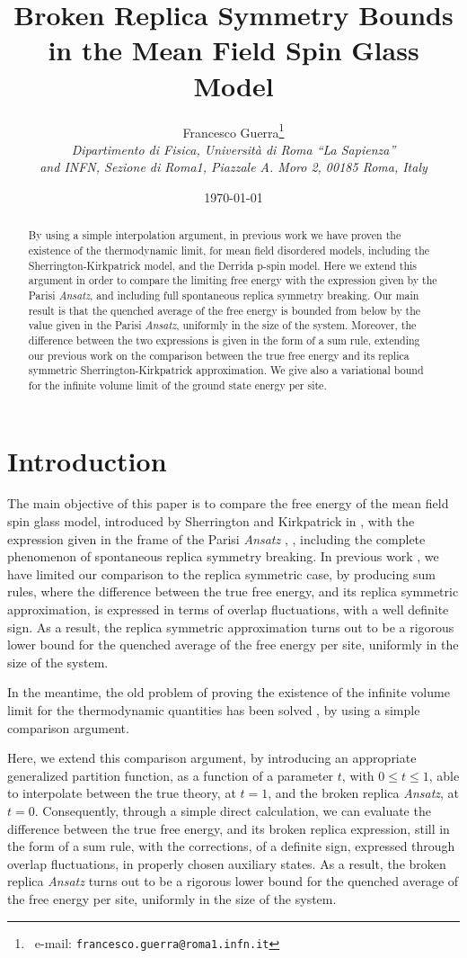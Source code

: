 \documentclass[a4paper,12pt]{article}
\title{Broken Replica Symmetry Bounds in the Mean Field Spin Glass Model}
\author{
Francesco Guerra\footnote{\
e-mail: {\tt francesco.guerra@roma1.infn.it}} \\
{\small {\itshape Dipartimento di Fisica, Universit\`a di Roma ``La Sapienza''}}
\\
{\small {\itshape and INFN, Sezione di Roma1, Piazzale A. Moro 2, 00185 Roma, 
Italy}}
}
\date{\today}
\begin{document}
\maketitle
%
\begin{abstract}
By using a simple interpolation argument, in previous work we have proven 
the existence of the thermodynamic limit, for mean field disordered models, 
including the Sherrington-Kirkpatrick model, and the Derrida p-spin model. 
Here we extend this argument in order to compare the limiting free energy 
with the expression given by the Parisi {\it Ansatz}, and including full 
spontaneous replica symmetry breaking. Our main result is that the quenched 
average of the free energy is bounded from below by the value given in the Parisi 
{\it Ansatz}, uniformly in the size of the system. Moreover, the difference
between the two expressions is given in the form of a sum rule, extending 
our previous work on the comparison between the true free energy and its 
replica symmetric Sherrington-Kirkpatrick approximation. We give also a 
variational bound for the infinite volume limit of the ground state energy 
per site. 
\end{abstract}
%
\newpage
\section{Introduction}
\label{intro}

The main objective of this paper is to compare the free energy of the mean 
field spin glass model, introduced by Sherrington and Kirkpatrick in \cite{SK}, 
with the expression given in 
the frame of the Parisi {\it Ansatz} \cite{P}, \cite{MPV}, including 
the complete phenomenon of spontaneous replica symmetry breaking. In 
previous work \cite{Gsum}, we have limited our comparison to the replica 
symmetric case, by producing sum rules, where the difference between the 
true free energy, and its replica symmetric approximation, is expressed in 
terms of overlap fluctuations, with a well definite sign. As a result, the 
replica symmetric approximation turns out to be a rigorous lower bound for 
the quenched average of the free energy per site, uniformly in the size of 
the system. 

In the meantime, the old problem of proving the existence of 
the infinite volume limit for the thermodynamic quantities has been solved 
\cite{GTthermo}, by using a simple comparison argument.

Here, we extend this comparison argument, by introducing an appropriate 
generalized partition function, as a function of a parameter $t$, 
with $0 \le t \le 1$, able to interpolate between the true theory, at 
$t=1$, and the broken replica  {\it Ansatz}, at $t=0$. Consequently, through 
a simple direct calculation, we can evaluate the difference between the 
true free energy, and its broken replica  expression, still in the form of a 
sum rule, with the corrections, of a definite sign, expressed through overlap 
fluctuations, in properly chosen auxiliary states. As a result, the broken replica 
 {\it Ansatz} turns out to be a rigorous lower bound for the 
quenched average of the free energy per site, uniformly in the size of the 
system.
\end{document}
